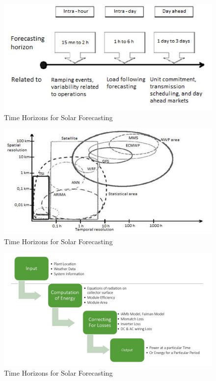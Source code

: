 \documentclass[12pt]{article}
\begin{document}
\begin{figure}[H]
\centering
\includegraphics[scale=0.5]{ForecastIntro1}
\caption{Time Horizons for Solar Forecasting}
\label{figc5h1} %
\end{figure}

\begin{figure}[H]
\centering
\includegraphics[scale=0.5]{ForecastIntro2}
\caption{Time Horizons for Solar Forecasting}
\label{figc5h1} %
\end{figure}

\begin{figure}[H]
\centering
\includegraphics[scale=0.5]{SolarAppAlgorithm}
\caption{Time Horizons for Solar Forecasting}
\label{figc4halgo1} %
\end{figure}
\end{document}
